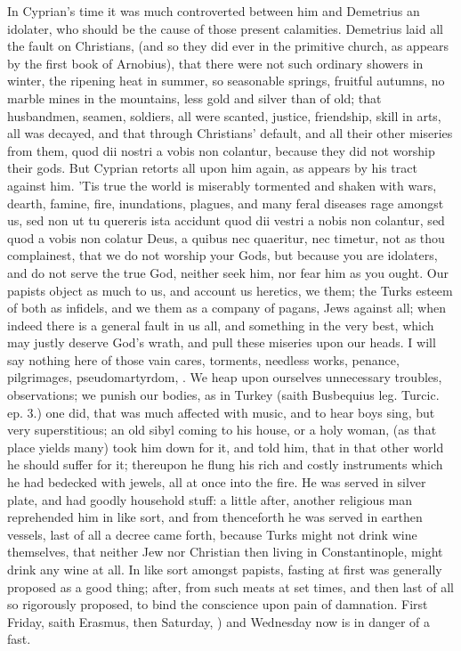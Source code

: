 {In Cyprian's time it was much controverted between him and Demetrius an
idolater, who should be the cause of those present calamities.
Demetrius laid all the fault on Christians, (and so they did ever in
the primitive church, as appears by the first book of Arnobius),
that there were not such ordinary showers in winter, the ripening
heat in summer, so seasonable springs, fruitful autumns, no marble
mines in the mountains, less gold and silver than of old; that
husbandmen, seamen, soldiers, all were scanted, justice, friendship,
skill in arts, all was decayed, and that through Christians' default,
and all their other miseries from them, quod dii nostri a vobis non
colantur, because they did not worship their gods. But Cyprian retorts
all upon him again, as appears by his tract against him. 'Tis true the
world is miserably tormented and shaken with wars, dearth, famine,
fire, inundations, plagues, and many feral diseases rage amongst us,
sed non ut tu quereris ista accidunt quod dii vestri a nobis non
colantur, sed quod a vobis non colatur Deus, a quibus nec quaeritur,
nec timetur, not as thou complainest, that we do not worship your Gods,
but because you are idolaters, and do not serve the true God, neither
seek him, nor fear him as you ought. Our papists object as much to us,
and account us heretics, we them; the Turks esteem of both as infidels,
and we them as a company of pagans, Jews against all; when indeed there
is a general fault in us all, and something in the very best, which may
justly deserve God's wrath, and pull these miseries upon our heads. I
will say nothing here of those vain cares, torments, needless works,
penance, pilgrimages, pseudomartyrdom, \etc{}. We heap upon ourselves
unnecessary troubles, observations; we punish our bodies, as in Turkey
(saith Busbequius leg. Turcic. ep. 3.) one did, that was much
affected with music, and to hear boys sing, but very superstitious; an
old sibyl coming to his house, or a holy woman, (as that place yields
many) took him down for it, and told him, that in that other world he
should suffer for it; thereupon he flung his rich and costly
instruments which he had bedecked with jewels, all at once into the
fire. He was served in silver plate, and had goodly household stuff: a
little after, another religious man reprehended him in like sort, and
from thenceforth he was served in earthen vessels, last of all a decree
came forth, because Turks might not drink wine themselves, that neither
Jew nor Christian then living in Constantinople, might drink any wine
at all. In like sort amongst papists, fasting at first was generally
proposed as a good thing; after, from such meats at set times, and then
last of all so rigorously proposed, to bind the conscience upon pain
of damnation. First Friday, saith Erasmus, then Saturday, ) and Wednesday now is in danger of a fast.

}
